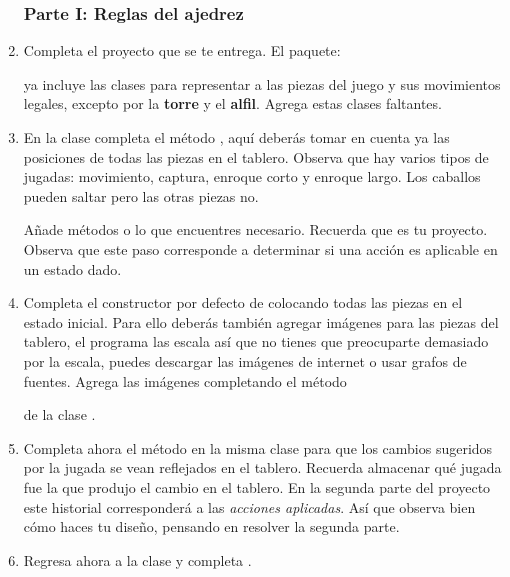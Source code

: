 \begin{enumerate}
\subsubsection{Parte I: Reglas del ajedrez}
 \item Completa el proyecto que se te entrega.  El paquete:
\begin{center}
\end{center}
  ya incluye las clases para representar a las piezas del juego y sus movimientos legales, excepto por la \textbf{torre} y el \textbf{alfil}.  Agrega estas clases faltantes.

 \item En la clase  completa el método , aquí deberás tomar en cuenta ya las posiciones de todas las piezas en el tablero.  Observa que hay varios tipos de jugadas: movimiento, captura, enroque corto y enroque largo. Los caballos pueden saltar pero las otras piezas no.

 Añade métodos o lo que encuentres necesario.  Recuerda que es tu proyecto.  Observa que este paso corresponde a determinar si una acción es aplicable en un estado dado.

 \item Completa el constructor por defecto de  colocando todas las piezas en el estado inicial.  Para ello deberás también agregar imágenes para las piezas del tablero, el programa las escala así que no tienes que preocuparte demasiado por la escala, puedes descargar las imágenes de internet o usar grafos de fuentes.  Agrega las imágenes completando el método
 \begin{center}
 \end{center}
 de la clase .


 \item Completa ahora el método  en la misma clase para que los cambios sugeridos por la jugada se vean reflejados en el tablero.  Recuerda almacenar qué jugada fue la que produjo el cambio en el tablero.  En la segunda parte del proyecto este historial corresponderá a las \emph{acciones aplicadas}.  Así que observa bien cómo haces tu diseño, pensando en resolver la segunda parte.

 \item Regresa ahora a la clase  y completa .


\end{enumerate}
